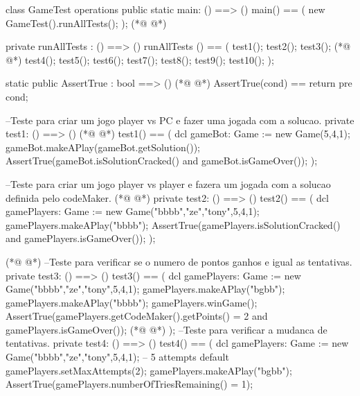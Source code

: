 \begin{vdmpp}[breaklines=true]
class GameTest
operations    
    public static main: () ==> ()
              main() ==
               (
                      new GameTest().runAllTests();
    );
(*@
\label{main:8}
@*)
  
 private runAllTests : () ==> ()
  runAllTests () == (
   test1();
   test2();
   test3();
(*@
\label{runAllTests:14}
@*)
   test4();
   test5();
   test6();
   test7();
   test8();
   test9();
   test10();
  );
 
 static public AssertTrue : bool ==> ()
(*@
\label{AssertTrue:24}
@*)
  AssertTrue(cond) == return
    pre cond;
    
  --Teste para criar um jogo player vs PC e fazer uma jogada com a solucao.
  private test1: () ==> ()
(*@
\label{test1:29}
@*)
  test1() ==
  (  
  dcl gameBot: Game := new Game(5,4,1);
  gameBot.makeAPlay(gameBot.getSolution());   
  AssertTrue(gameBot.isSolutionCracked() and gameBot.isGameOver());
  );
  
  --Teste para criar um jogo player vs player e fazera um jogada com a solucao definida pelo codeMaker.
(*@
\label{test2:37}
@*)
  private test2: () ==> ()
  test2() ==
  (  
   dcl gamePlayers: Game := new Game("bbbb","ze","tony",5,4,1);
  gamePlayers.makeAPlay("bbbb");   
  AssertTrue(gamePlayers.isSolutionCracked() and gamePlayers.isGameOver());
  );
  
(*@
\label{test3:45}
@*)
  --Teste para verificar se o numero de pontos ganhos e igual as tentativas.
  private test3: () ==> ()
  test3() ==
  (  
  dcl gamePlayers: Game := new Game("bbbb","ze","tony",5,4,1);
  gamePlayers.makeAPlay("bgbb"); 
  gamePlayers.makeAPlay("bbbb"); 
  gamePlayers.winGame();
  AssertTrue(gamePlayers.getCodeMaker().getPoints() = 2  and gamePlayers.isGameOver());
(*@
\label{test4:54}
@*)
  );
  --Teste para verificar a mudanca de tentativas.
  private test4: () ==> ()
  test4() ==
  (  
  dcl gamePlayers: Game := new Game("bbbb","ze","tony",5,4,1);  -- 5 attempts default
  gamePlayers.setMaxAttempts(2); 
  gamePlayers.makeAPlay("bgbb");
  AssertTrue(gamePlayers.numberOfTriesRemaining() = 1);


\end{vdmpp}
